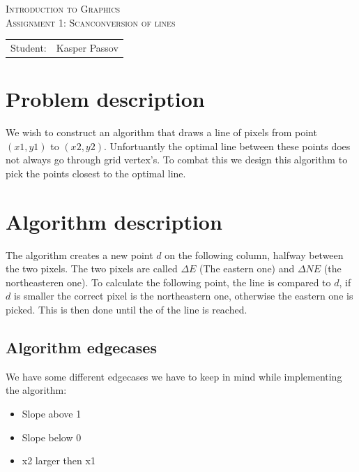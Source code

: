 \documentclass{article}
\begin{document}
\begin{titlepage}
\begin{center}
\textsc{Introduction to Graphics}\\[0.5cm]
\textsc{Assignment 1: Scanconversion of lines}\\[0.5cm]
\vspace{2 cm}
\begin{tabular}{ll}
Student: & Kasper Passov\\
\end{tabular}
\end{center}
\vspace{5 cm}
\newpage
\end{titlepage}

\section{Problem description}
We wish to construct an algorithm that draws a line of pixels from
point $(x1,y1)$ to $(x2,y2)$. Unfortuantly the optimal line between
these points does not always go through grid vertex's.
To combat this we design this algorithm to pick the points closest to
the optimal line.

\section{Algorithm description}

The algorithm creates a new point $d$ on the following column, halfway 
between the two pixels. The two pixels are called $\Delta E$ (The eastern one)
and $\Delta NE$ (the northeasteren one). To calculate the following point,
the line is compared to $d$, if $d$ is smaller the correct pixel is the northeastern
one, otherwise the eastern one is picked. This is then done until the of the line is
reached.

\subsection{Algorithm edgecases}

We have some different edgecases we have to keep in
mind while implementing the algorithm:

\begin{itemize}
    \item{Slope above 1}
    \item{Slope below 0}
    \item{x2 larger then x1} 
\end{itemize}
\end{document}

